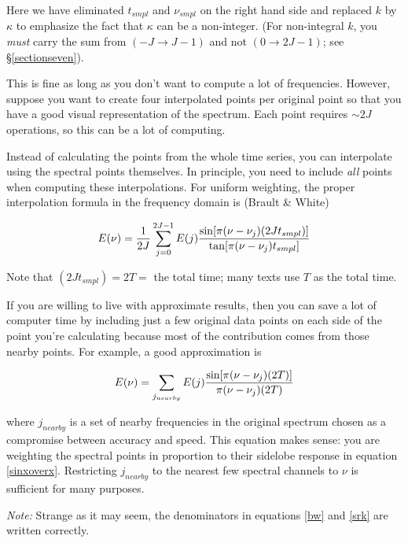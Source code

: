 \documentclass[preprint]{aastex}
\begin{document}
\noindent Here we have eliminated $t_{smpl}$ and $\nu_{smpl}$ on the
right hand side and replaced $k$ by $\kappa$ to emphasize the fact that
$\kappa$ can be a non-integer. (For non-integral $k$, you {\it must}
carry the sum from $(-J \rightarrow J-1)$ and not $(0 \rightarrow
2J-1)$; see \S \ref{sectionseven}). 

	This is fine as long as you don't want to compute a lot of
frequencies. However, suppose you want to create four interpolated
points per original point so that you have a good visual representation
of the spectrum. Each point requires $\sim 2J$ operations, so this can
be a lot of computing.

	Instead of calculating the points from the whole time series,
you can interpolate using the spectral points themselves. In principle,
you need to include {\it all} points when computing these
interpolations.  For uniform weighting, the proper interpolation formula
in the frequency domain is (Brault \& White)

\begin{equation} \label{bw}
E(\nu) = {1 \over 2J} \sum_{j=0}^{2J-1} E(j) 
  { \sin[ \pi (\nu - \nu_j) (2Jt_{smpl})] \over
    \tan[ \pi (\nu - \nu_j) t_{smpl} ] }
\end{equation}

\noindent Note that $(2Jt_{smpl}) = 2T =$ the total time; many texts use
$T$ as the total time.

	If you are willing to live with approximate results, then you
can save a lot of computer time by including just a few original data
points on each side of the point you're calculating because most of the
contribution comes from those nearby points. For example, a good
approximation is 

\begin{equation} \label{srk}
E(\nu) = \sum_{j_{nearby}} E(j) 
  { \sin[ \pi (\nu - \nu_j) (2T) ] \over
     \pi (\nu - \nu_j) (2T)  }
\end{equation}

\noindent where $j_{nearby}$ is a set of nearby frequencies in the
original spectrum chosen as a compromise between accuracy and speed.
This equation makes sense: you are weighting the spectral points in
proportion to their sidelobe response in equation \ref{sinxoverx}. 
Restricting $j_{nearby}$ to the nearest few spectral channels to $\nu$
is sufficient for many purposes. 

	{\it Note:} Strange as it may seem, the denominators in
equations \ref{bw} and \ref{srk} are written correctly.
\end{document}
